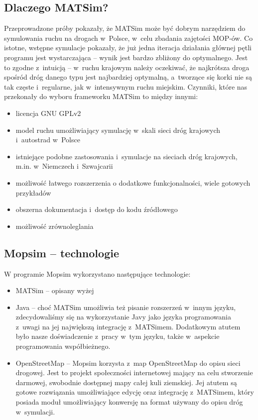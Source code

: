 \subsection{Dlaczego MATSim?}
Przeprowadzone próby pokazały, że MATSim może być dobrym narzędziem do symulowania ruchu na drogach w~Polsce, w~celu zbadania zajętości MOP-ów. Co istotne, wstępne symulacje pokazały, że już jedna iteracja działania głównej pętli programu jest wystarczająca -- wynik jest bardzo zbliżony do optymalnego. Jest to zgodne z~intuicją -- w~ruchu krajowym należy oczekiwać, że najkrótsza droga spośród dróg danego typu jest najbardziej optymalną, a~tworzące się korki nie są tak częste i~regularne, jak w~intensywnym ruchu miejskim. Czynniki, które nas przekonały do wyboru frameworku MATSim to między innymi:
\begin{itemize}
\item licencja GNU GPLv2
\item model ruchu umożliwiający symulację w~skali sieci dróg krajowych i~autostrad w~Polsce
\item istniejące podobne zastosowania i~symulacje na sieciach dróg krajowych, m.in. w~Niemczech i~Szwajcarii
\item możliwość łatwego rozszerzenia o dodatkowe funkcjonalności, wiele gotowych przykładów
\item obszerna dokumentacja i~dostęp do kodu źródłowego
\item możliwość zrównoleglania
\end{itemize}

\subsection{Mopsim -- technologie}
W programie Mopsim wykorzystano następujące technologie:
\begin{itemize}
\item MATSim -- opisany wyżej
\item Java -- choć MATSim umożliwia też pisanie rozszerzeń w~innym języku, zdecydowaliśmy się na wykorzystanie Javy jako języka programowania z~uwagi na jej największą integrację z~MATSimem. Dodatkowym atutem było nasze doświadczenie z~pracy w~tym języku, także w~aspekcie programowania współbieżnego.
\item OpenStreetMap\cite{osm} -- Mopsim korzysta z~map OpenStreetMap do opisu sieci drogowej. Jest to projekt społeczności internetowej mający na celu stworzenie darmowej, swobodnie dostępnej mapy całej kuli ziemskiej. Jej atutem są gotowe rozwiązania umożliwiające edycję oraz integrację z~MATSimem, który posiada moduł umożliwiający konwersję na format używany do opisu dróg w~symulacji.
\end{itemize}
